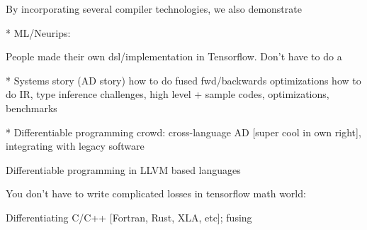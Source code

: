 






By incorporating several compiler technologies, we also demonstrate 





* ML/Neurips:

People made their own dsl/implementation in Tensorflow. Don't have to do a 

* Systems story (AD story) how to do fused fwd/backwards optimizations how to do IR, type inference challenges, high level
 + sample codes, optimizations, benchmarks

* Differentiable programming crowd: cross-language AD [super cool in own right], integrating with legacy software

Differentiable programming in LLVM based languages



You don't have to write complicated losses in tensorflow math world:


Differentiating C/C++ [Fortran, Rust, XLA, etc]; 
fusing
